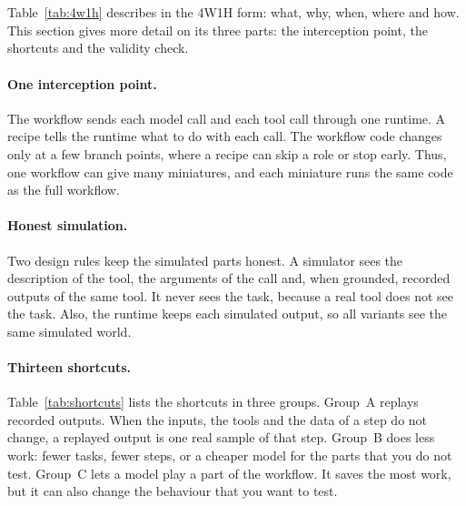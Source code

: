 \section{\sys{}}
\label{sec:system}



Table~\ref{tab:4w1h} describes \sys{} in the 4W1H form: what, why, when, where and how. This
section gives more detail on its three parts: the interception point, the shortcuts and the
validity check.

\paragraph{One interception point.}
The workflow sends each model call and each tool call through one runtime. A recipe tells the
runtime what to do with each call. The workflow code changes only at a few branch points, where a
recipe can skip a role or stop early. Thus, one workflow
can give many miniatures, and each miniature runs the same code as the full workflow.

\paragraph{Honest simulation.}
Two design rules keep the simulated parts honest. A simulator sees the description of the tool, the
arguments of the call and, when grounded, recorded outputs of the same tool. It never sees the
task, because a real tool does not see the task. Also, the runtime keeps each simulated output, so
all variants see the same simulated world.



\paragraph{Thirteen shortcuts.}
Table~\ref{tab:shortcuts} lists the shortcuts in three groups. Group~A replays recorded outputs. When
the inputs, the tools and the data of a step do not change, a replayed output is one real sample of
that step. Group~B does less work: fewer tasks, fewer steps, or a cheaper model for
the parts that you do not test. Group~C lets a model play a part of the workflow. It saves the most
work, but it can also change the behaviour that you want to test.

